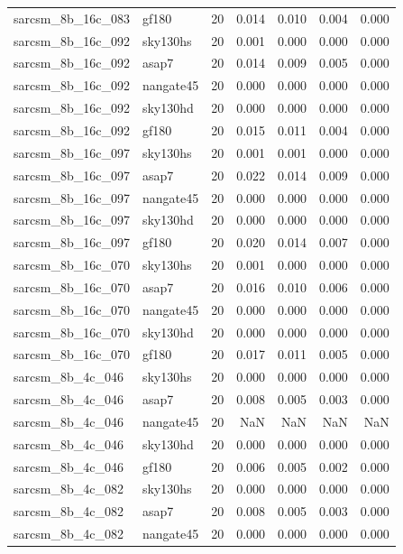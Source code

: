 \begin{tabular}{llrrrrr}
sarcsm\_8b\_16c\_083 & gf180 & 20 & 0.014 & 0.010 & 0.004 & 0.000 \\
sarcsm\_8b\_16c\_092 & sky130hs & 20 & 0.001 & 0.000 & 0.000 & 0.000 \\
sarcsm\_8b\_16c\_092 & asap7 & 20 & 0.014 & 0.009 & 0.005 & 0.000 \\
sarcsm\_8b\_16c\_092 & nangate45 & 20 & 0.000 & 0.000 & 0.000 & 0.000 \\
sarcsm\_8b\_16c\_092 & sky130hd & 20 & 0.000 & 0.000 & 0.000 & 0.000 \\
sarcsm\_8b\_16c\_092 & gf180 & 20 & 0.015 & 0.011 & 0.004 & 0.000 \\
sarcsm\_8b\_16c\_097 & sky130hs & 20 & 0.001 & 0.001 & 0.000 & 0.000 \\
sarcsm\_8b\_16c\_097 & asap7 & 20 & 0.022 & 0.014 & 0.009 & 0.000 \\
sarcsm\_8b\_16c\_097 & nangate45 & 20 & 0.000 & 0.000 & 0.000 & 0.000 \\
sarcsm\_8b\_16c\_097 & sky130hd & 20 & 0.000 & 0.000 & 0.000 & 0.000 \\
sarcsm\_8b\_16c\_097 & gf180 & 20 & 0.020 & 0.014 & 0.007 & 0.000 \\
sarcsm\_8b\_16c\_070 & sky130hs & 20 & 0.001 & 0.000 & 0.000 & 0.000 \\
sarcsm\_8b\_16c\_070 & asap7 & 20 & 0.016 & 0.010 & 0.006 & 0.000 \\
sarcsm\_8b\_16c\_070 & nangate45 & 20 & 0.000 & 0.000 & 0.000 & 0.000 \\
sarcsm\_8b\_16c\_070 & sky130hd & 20 & 0.000 & 0.000 & 0.000 & 0.000 \\
sarcsm\_8b\_16c\_070 & gf180 & 20 & 0.017 & 0.011 & 0.005 & 0.000 \\
sarcsm\_8b\_4c\_046 & sky130hs & 20 & 0.000 & 0.000 & 0.000 & 0.000 \\
sarcsm\_8b\_4c\_046 & asap7 & 20 & 0.008 & 0.005 & 0.003 & 0.000 \\
sarcsm\_8b\_4c\_046 & nangate45 & 20 & NaN & NaN & NaN & NaN \\
sarcsm\_8b\_4c\_046 & sky130hd & 20 & 0.000 & 0.000 & 0.000 & 0.000 \\
sarcsm\_8b\_4c\_046 & gf180 & 20 & 0.006 & 0.005 & 0.002 & 0.000 \\
sarcsm\_8b\_4c\_082 & sky130hs & 20 & 0.000 & 0.000 & 0.000 & 0.000 \\
sarcsm\_8b\_4c\_082 & asap7 & 20 & 0.008 & 0.005 & 0.003 & 0.000 \\
sarcsm\_8b\_4c\_082 & nangate45 & 20 & 0.000 & 0.000 & 0.000 & 0.000 \\

\end{tabular}
